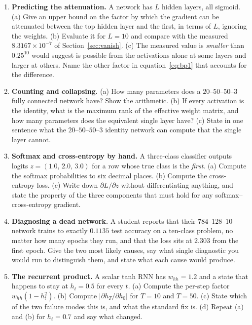 \documentclass[11pt]{article}
\begin{document}
\begin{enumerate}[leftmargin=*]
  \item \textbf{Predicting the attenuation.} A network has $L$ hidden layers,
    all sigmoid. (a) Give an upper bound on the factor by which the gradient
    can be attenuated between the top hidden layer and the first, in terms of
    $L$, ignoring the weights. (b) Evaluate it for $L = 10$ and compare with
    the measured $8.3167\times10^{-7}$ of Section~\ref{sec:vanish}. (c) The
    measured value is \emph{smaller} than $0.25^{10}$ would suggest is
    possible from the activations alone at some layers and larger at others.
    Name the other factor in equation~\eqref{eq:bp1} that accounts for the
    difference.

  \item \textbf{Counting and collapsing.} (a) How many parameters does a
    $20$--$50$--$50$--$3$ fully connected network have? Show the arithmetic.
    (b) If every activation is the identity, what is the maximum rank of the
    effective weight matrix, and how many parameters does the equivalent
    single layer have? (c) State in one sentence what the $20$--$50$--$50$--$3$
    identity network can compute that the single layer cannot.

  \item \textbf{Softmax and cross-entropy by hand.} A three-class classifier
    outputs logits $z = (1.0,\, 2.0,\, 3.0)$ for a row whose true class is the
    \emph{first}. (a) Compute the softmax probabilities to six decimal places.
    (b) Compute the cross-entropy loss. (c) Write down $\partial L/\partial z$
    without differentiating anything, and state the property of the three
    components that must hold for any softmax--cross-entropy gradient.

  \item \textbf{Diagnosing a dead network.} A student reports that their
    $784$--$128$--$10$ network trains to exactly $0.1135$ test accuracy on a
    ten-class problem, no matter how many epochs they run, and that the loss
    sits at $2.303$ from the first epoch. Give the two most likely causes, say
    what single diagnostic you would run to distinguish them, and state what
    each cause would produce.

  \item \textbf{The recurrent product.} A scalar tanh RNN has
    $w_{hh} = 1.2$ and a state that happens to stay at $h_t = 0.5$ for every
    $t$. (a) Compute the per-step factor $w_{hh}(1 - h_t^2)$. (b) Compute
    $|\partial h_T/\partial h_0|$ for $T = 10$ and $T = 50$. (c) State which
    of the two failure modes this is, and what the standard fix is. (d) Repeat
    (a) and (b) for $h_t = 0.7$ and say what changed.
\end{enumerate}
\end{document}
